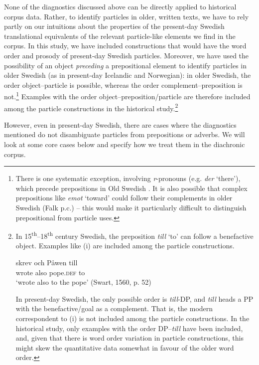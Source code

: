 \documentclass[output=paper]{langscibook}
\begin{document}
None of the diagnostics discussed above can be directly applied to historical corpus data. Rather, to identify particles in older, written texts, we have to rely partly on our intuitions about the properties of the present-day Swedish translational equivalents of the relevant particle-like elements we find in the corpus. In this study, we have included constructions that would have the word order and prosody of present-day Swedish particles. Moreover, we have used the possibility of an object \textit{preceding} a prepositional element to identify particles in older Swedish (as in present-day Icelandic and Norwegian): in older Swedish, the order object–particle is possible, whereas the order complement–preposition is not.\footnote{There is one systematic exception, involving \textit{r}{}-pronouns (e.g. \textit{der} ‘there’), which precede prepositions in Old Swedish \citep{Delsing2014Svenskans}. It is also possible that complex prepositions like \textit{emot} ‘toward’ could follow their complements in older Swedish (Falk p.c.) – this would make it particularly difficult to distinguish prepositional from particle uses.}  Examples with the order object–preposition/particle are therefore included among the particle constructions in the historical study.\footnote{In
    15\textsuperscript{th}--18\textsuperscript{th} century Swedish, the preposition \textit{till} ‘to’ can follow a benefactive object. Examples like (i) are included among the particle constructions.

    \ea
    \gll skrev   och   Påwen   till\\
    wrote   also  pope.\textsc{def}   to\\
    \glt ‘wrote also to the pope’ (Swart, 1560, p. 52)
    \z

    In present-day Swedish, the only possible order is \textit{till}-DP, and \textit{till} heads a PP with the benefactive/goal as a complement. That is, the modern correspondent to (i) is not included among the particle constructions. In the historical study, only examples with the order DP–\textit{till} have been included, and, given that there is word order variation in particle constructions, this might skew the quantitative data somewhat in favour of the older word order.
}



However, even in present-day Swedish, there are cases where the diagnostics mentioned do not disambiguate particles from prepositions or adverbs. We will look at some core cases below and specify how we treat them in the diachronic corpus.
\end{document}
